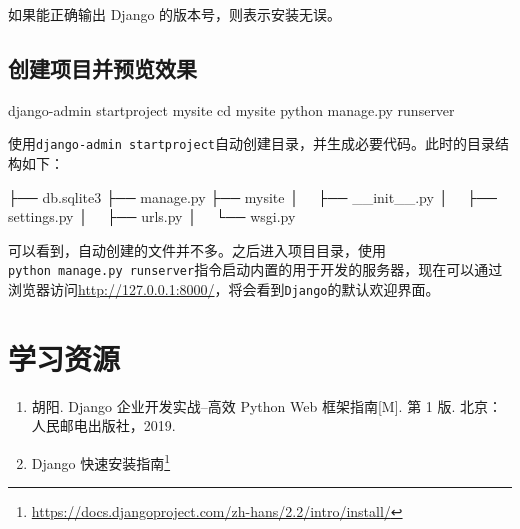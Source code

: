 \documentclass[]{ctexbook}
\newenvironment{Shaded}{\begin{snugshade}}{\end{snugshade}}
\newcommand{\BuiltInTok}[1]{#1}
\newcommand{\ExtensionTok}[1]{#1}
\newcommand{\NormalTok}[1]{#1}
\providecommand{\tightlist}{%
  \setlength{\itemsep}{0pt}\setlength{\parskip}{0pt}}
\renewcommand{\href}[2]{#2\footnote{\url{#1}}}
\begin{document}
如果能正确输出 Django 的版本号，则表示安装无误。

\hypertarget{ux521bux5efaux9879ux76eeux5e76ux9884ux89c8ux6548ux679c}{%
\subsection{创建项目并预览效果}\label{ux521bux5efaux9879ux76eeux5e76ux9884ux89c8ux6548ux679c}}

\begin{Shaded}
\begin{Highlighting}[]
\ExtensionTok{django-admin}\NormalTok{ startproject mysite}
\BuiltInTok{cd}\NormalTok{ mysite}
\ExtensionTok{python}\NormalTok{ manage.py runserver}
\end{Highlighting}
\end{Shaded}

使用\texttt{django-admin\ startproject}自动创建目录，并生成必要代码。此时的目录结构如下：

\begin{Shaded}
\begin{Highlighting}[]
\NormalTok{├── }\ExtensionTok{db.sqlite3}
\NormalTok{├── }\ExtensionTok{manage.py}
\NormalTok{├── }\ExtensionTok{mysite}
\NormalTok{│   ├── }\ExtensionTok{__init__.py}
\NormalTok{│   ├── }\ExtensionTok{settings.py}
\NormalTok{│   ├── }\ExtensionTok{urls.py}
\NormalTok{│   └── }\ExtensionTok{wsgi.py}
\end{Highlighting}
\end{Shaded}

可以看到，自动创建的文件并不多。之后进入项目目录，使用\texttt{python\ manage.py\ runserver}指令启动内置的用于开发的服务器，现在可以通过浏览器访问\url{http://127.0.0.1:8000/}，将会看到\texttt{Django}的默认欢迎界面。

\hypertarget{ux5b66ux4e60ux8d44ux6e90-1}{%
\section{学习资源}\label{ux5b66ux4e60ux8d44ux6e90-1}}

\begin{enumerate}
\def\labelenumi{\arabic{enumi}.}
\tightlist
\item
  胡阳. Django 企业开发实战--高效 Python Web 框架指南{[}M{]}. 第 1 版. 北京：人民邮电出版社，2019.
\item
  \href{https://docs.djangoproject.com/zh-hans/2.2/intro/install/}{Django 快速安装指南}
\end{enumerate}
\end{document}
